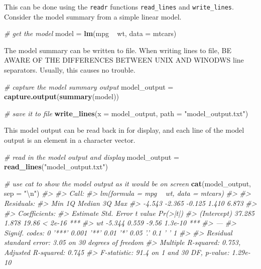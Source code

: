 \documentclass[]{book}
\newenvironment{Shaded}{}{}
\newcommand{\CharTok}[1]{\textcolor[rgb]{0.25,0.44,0.63}{#1}}
\newcommand{\CommentTok}[1]{\textcolor[rgb]{0.38,0.63,0.69}{\textit{#1}}}
\newcommand{\DataTypeTok}[1]{\textcolor[rgb]{0.56,0.13,0.00}{#1}}
\newcommand{\KeywordTok}[1]{\textcolor[rgb]{0.00,0.44,0.13}{\textbf{#1}}}
\newcommand{\NormalTok}[1]{#1}
\newcommand{\OperatorTok}[1]{\textcolor[rgb]{0.40,0.40,0.40}{#1}}
\newcommand{\StringTok}[1]{\textcolor[rgb]{0.25,0.44,0.63}{#1}}
\begin{document}
This can be done using the \texttt{readr} functions \texttt{read\_lines} and \texttt{write\_lines}. Consider the model summary from a simple linear model.

\begin{Shaded}
\begin{Highlighting}[]
\CommentTok{# get the model}
\NormalTok{model =}\StringTok{ }\KeywordTok{lm}\NormalTok{(mpg }\OperatorTok{~}\StringTok{ }\NormalTok{wt, }\DataTypeTok{data =}\NormalTok{ mtcars)}
\end{Highlighting}
\end{Shaded}

The model summary can be written to file. When writing lines to file, BE AWARE OF THE DIFFERENCES BETWEEN UNIX AND WINODWS line separators. Usually, this causes no trouble.

\begin{Shaded}
\begin{Highlighting}[]
\CommentTok{# capture the model summary output}
\NormalTok{model_output =}\StringTok{ }\KeywordTok{capture.output}\NormalTok{(}\KeywordTok{summary}\NormalTok{(model))}

\CommentTok{# save it to file}
\KeywordTok{write_lines}\NormalTok{(}\DataTypeTok{x =}\NormalTok{ model_output,}
  \DataTypeTok{path =} \StringTok{"model_output.txt"}\NormalTok{)}
\end{Highlighting}
\end{Shaded}

This model output can be read back in for display, and each line of the model output is an element in a character vector.

\begin{Shaded}
\begin{Highlighting}[]
\CommentTok{# read in the model output and display}
\NormalTok{model_output =}\StringTok{ }\KeywordTok{read_lines}\NormalTok{(}\StringTok{"model_output.txt"}\NormalTok{)}

\CommentTok{# use cat to show the model output as it would be on screen}
\KeywordTok{cat}\NormalTok{(model_output, }\DataTypeTok{sep =} \StringTok{"}\CharTok{\textbackslash{}n}\StringTok{"}\NormalTok{)}
\CommentTok{#> }
\CommentTok{#> Call:}
\CommentTok{#> lm(formula = mpg ~ wt, data = mtcars)}
\CommentTok{#> }
\CommentTok{#> Residuals:}
\CommentTok{#>    Min     1Q Median     3Q    Max }
\CommentTok{#> -4.543 -2.365 -0.125  1.410  6.873 }
\CommentTok{#> }
\CommentTok{#> Coefficients:}
\CommentTok{#>             Estimate Std. Error t value Pr(>|t|)    }
\CommentTok{#> (Intercept)   37.285      1.878   19.86  < 2e-16 ***}
\CommentTok{#> wt            -5.344      0.559   -9.56  1.3e-10 ***}
\CommentTok{#> ---}
\CommentTok{#> Signif. codes:  0 '***' 0.001 '**' 0.01 '*' 0.05 '.' 0.1 ' ' 1}
\CommentTok{#> }
\CommentTok{#> Residual standard error: 3.05 on 30 degrees of freedom}
\CommentTok{#> Multiple R-squared:  0.753,	Adjusted R-squared:  0.745 }
\CommentTok{#> F-statistic: 91.4 on 1 and 30 DF,  p-value: 1.29e-10}
\end{Highlighting}
\end{Shaded}
\end{document}
